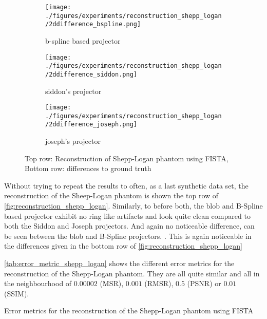 \begin{figure}[h]
{{			\begin{subfigure}[b]{0.3125\textwidth}
				\texttt{[image: ./figures/experiments/reconstruction\_shepp\_logan/2ddifference\_bspline.png]}
				\caption{b-spline based projector}%
				\label{fig:reconstruction_shepp_logan_diff_bspline}
			\end{subfigure}
			\begin{subfigure}[b]{0.3125\textwidth}
				\texttt{[image: ./figures/experiments/reconstruction\_shepp\_logan/2ddifference\_siddon.png]}
				\caption{siddon's projector}%
				\label{fig:reconstruction_shepp_logan_diff_siddon}
			\end{subfigure}
			\begin{subfigure}[b]{0.3125\textwidth}
				\texttt{[image: ./figures/experiments/reconstruction\_shepp\_logan/2ddifference\_joseph.png]}
				\caption{joseph's projector}%
				\label{fig:reconstruction_shepp_logan_diff_joseph}
			\end{subfigure}
		}}
	\caption{Top row: Reconstruction of Shepp-Logan phantom using FISTA, Bottom row: differences
        to ground truth}%
	\label{fig:reconstruction_shepp_logan}
\end{figure}

Without trying to repeat the results to often, as a last synthetic data set, the reconstruction of
the Sheep-Logan phantom is shown the top row of \autoref{fig:reconstruction_shepp_logan}. Similarly,
to before both, the blob and B-Spline based projector exhibit no ring like artifacts and look quite
clean compared to both the Siddon and Joseph projectors. And again no noticeable difference, can be
seen between the blob and B-Spline projectors. . This is again noticeable in the differences given in the bottom row of
\autoref{fig:reconstruction_shepp_logan}

\autoref{tab:error_metric_shepp_logan} shows the different error metrics for the reconstruction of
the Shepp-Logan phantom. They are all quite similar and all in the neighbourhood of \(0.00002\)
(MSR), \(0.001\) (RMSR), \(0.5\) (PSNR) or \(0.01\) (SSIM). 

\begin{table}%
	\centering
	\caption{Error metrics for the reconstruction of the Shepp-Logan phantom using FISTA}%
	\label{tab:error_metric_shepp_logan}
\end{table}

